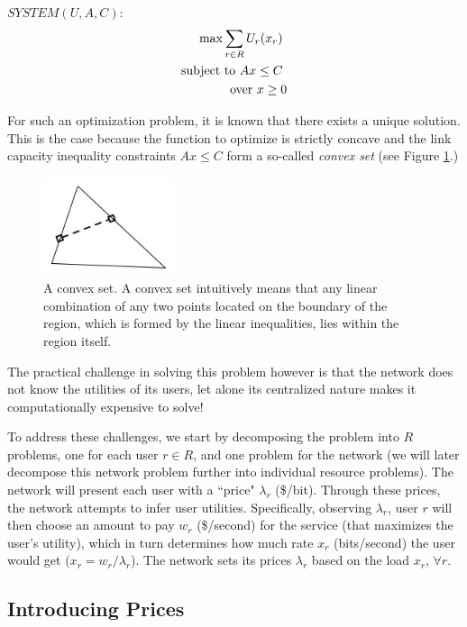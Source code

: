 \documentclass{article}
\begin{document}
$SYSTEM(U, A, C):$
\begin{eqnarray*}
{\rm max} \sum_{r \in R} U_r(x_r) \ \\
{\rm subject~to}\ A x \leq C \ \\
{\rm over}\  x \geq 0
\end{eqnarray*}

For such an optimization problem, it is known that there exists a unique solution. This is the case because the function to optimize is strictly concave and the link capacity inequality constraints $A x \leq C$ form a so-called {\em convex set} (see Figure \ref{fig:convex-set}.)

\begin{figure}[htbp] %
   \centering
   \includegraphics[width=1.5in]{figures/convex-set.jpg} 
   \caption{A convex set. A convex set intuitively means that any linear combination of any two points located on the boundary of the region, which is formed by the linear inequalities, lies within the region itself. }
   \label{fig:convex-set}
\end{figure}

The practical challenge in solving this problem however is that the network does not know the utilities of its users, let alone its centralized nature makes it computationally expensive to solve!

To address these challenges, we start by decomposing the problem into $R$ problems, one for each user $r \in R$, and one problem for the network (we will later decompose this network problem further into individual resource problems). The network will present each user with a ``price" $\lambda_r$ (\$/bit).
Through these prices, the network attempts to infer user utilities.
Specifically, observing $\lambda_r$,
user $r$ will then choose an amount to pay $w_r$ (\$/second) for the service (that maximizes the user's utility), 
which in turn determines how much rate $x_r$ (bits/second) the user would get ($x_r = w_r/\lambda_r$).  
The network sets its prices $\lambda_r$ based on the load $x_r$, $\forall r$.

\subsection{Introducing Prices}
\end{document}
